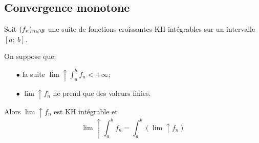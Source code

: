 \subsection{Convergence monotone}

\begin{theo}
Soit $(f_n)_{n \in \N}$ une suite de fonctions croissantes KH-intégrables sur un intervalle $[a;~b]$.

On suppose que:
\begin{itemize}
\item[$\bullet$]
la suite $\lim \uparrow \int_a^b f_n < +\infty$;
\item[$\bullet$]
$\lim \uparrow f_n$ ne prend que des valeurs finies.
\end{itemize}

Alors $\lim \uparrow f_n$ est KH intégrable et
\[
\lim \uparrow \int_a^b f_n = \int_a^b \left (\lim \uparrow f_n\right )
\]
\end{theo}

